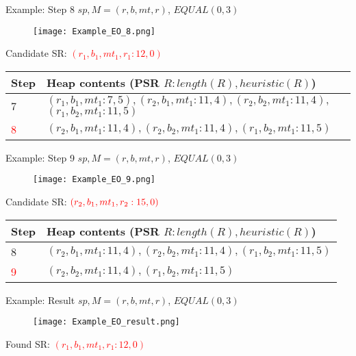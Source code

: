 \begin{frame}{Example: Step 8}
	$sp, M = (r, b, mt, r)$, $EQUAL(0, 3)$
	
	\begin{figure}[h]
		\texttt{[image: Example\_EO\_8.png]}
	\end{figure}
	
	Candidate SR: \textcolor{red}{$(r_1, b_1, mt_1, r_1 : 12, 0)$}
	
	\begin{table}[h]
		\centering
		\begin{tabular}{ |l|p{10cm}| } 
			\hline
			Step & Heap contents (PSR $R : length(R), heuristic(R)$) \\
			\hline
			7 & $(r_1, b_1, mt_1 : 7, 5), (r_2, b_1, mt_1 : 11, 4), (r_2, b_2, mt_1 : 11, 4),$ \newline $(r_1, b_2, mt_1 : 11, 5)$ \\ 
			\hline
			\textcolor{red}{8} & $(r_2, b_1, mt_1 : 11, 4), (r_2, b_2, mt_1 : 11, 4), (r_1, b_2, mt_1 : 11, 5)$ \\ 
			\hline
		\end{tabular}
	\end{table}

\end{frame}

\begin{frame}{Example: Step 9}
	$sp, M = (r, b, mt, r)$, $EQUAL(0, 3)$
	
	\begin{figure}[h]
		\texttt{[image: Example\_EO\_9.png]}
	\end{figure}
	
	Candidate SR: \st{$\textcolor{red}{(r_2, b_1, mt_1, r_2 : 15, 0)}$}

	\begin{table}[h]
		\centering
		\begin{tabular}{ |l|p{10cm}| } 
			\hline
			Step & Heap contents (PSR $R : length(R), heuristic(R)$) \\
			\hline
			8 & $(r_2, b_1, mt_1 : 11, 4), (r_2, b_2, mt_1 : 11, 4), (r_1, b_2, mt_1 : 11, 5)$ \\ 
			\hline
			\textcolor{red}{9} & $(r_2, b_2, mt_1 : 11, 4), (r_1, b_2, mt_1 : 11, 5)$ \\ 
			\hline
		\end{tabular}
	\end{table}

\end{frame}
\begin{frame}{Example: Result}
$sp, M = (r, b, mt, r)$, $EQUAL(0, 3)$

\begin{figure}[h]
	\texttt{[image: Example\_EO\_result.png]}
\end{figure}

Found SR: \textcolor{red}{$(r_1, b_1, mt_1, r_1 : 12, 0)$}

\end{frame}

